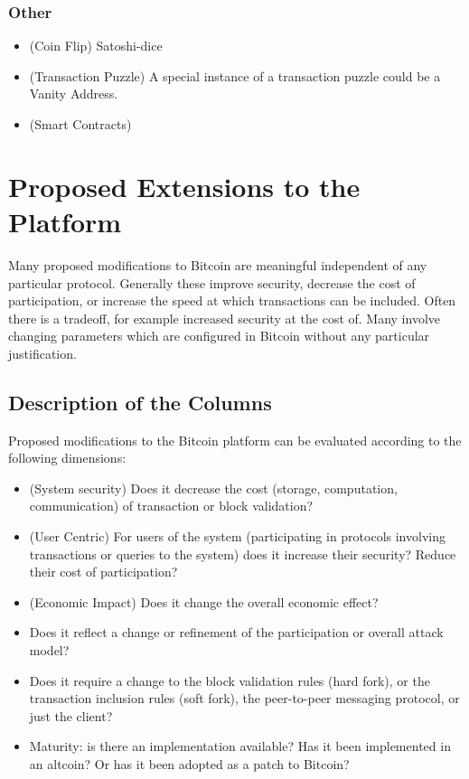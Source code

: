 \subsubsection{Other}

\begin{itemize}
\item (Coin Flip) Satoshi-dice
\item (Transaction Puzzle) A special instance of a transaction puzzle could be a Vanity Address.
\item (Smart Contracts)
\end{itemize}



\section{Proposed Extensions to the Platform}

Many proposed modifications to Bitcoin are meaningful independent of any particular protocol. Generally these improve security, decrease the cost of participation, or increase the speed at which transactions can be included. Often there is a tradeoff, for example increased security at the cost of. Many involve changing parameters which are configured in Bitcoin without any particular justification.

\subsection{Description of the Columns}
Proposed modifications to the Bitcoin platform can be evaluated according to the following dimensions:
\begin{itemize}
\item (System security) Does it decrease the cost (storage, computation, communication) of transaction or block validation?
\item (User Centric) For users of the system (participating in protocols involving transactions or queries to the system) does it increase their security? Reduce their cost of participation?
\item (Economic Impact) Does it change the overall economic effect?
\item Does it reflect a change or refinement of the participation or overall attack model?
\item Does it require a change to the block validation rules (hard fork), or the transaction inclusion rules (soft fork), the peer-to-peer messaging protocol, or just the client?
\item Maturity: is there an implementation available? Has it been implemented in an altcoin? Or has it been adopted as a patch to Bitcoin?
\end{itemize}

